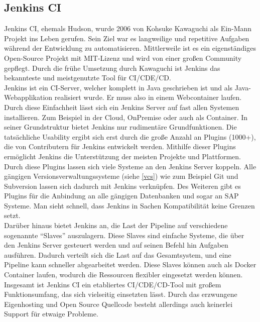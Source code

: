 \subsection{Jenkins CI} Jenkins CI, ehemals Hudson, wurde 2006 von Kohsuke Kawaguchi als Ein-Mann Projekt ins Leben gerufen.\autocite[Vgl.][S.56]{Wiest.2011} Sein Ziel war es langweilige und repetitive Aufgaben während der Entwicklung zu automatisieren. Mittlerweile ist es ein eigenständiges Open-Source Projekt mit MIT-Lizenz und wird von einer großen Community gepflegt. Durch die frühe Umsetzung durch Kawaguchi ist Jenkins das bekannteste und meistgenutzte Tool für \ac{CI}/\ac{CDE}/\ac{CD}.\autocite[Vgl.][]{Jenkins.2019}\\
Jenkins ist ein CI-Server, welcher komplett in Java geschrieben ist und als Java-Webapplikation realisiert wurde. Er muss also in einem Webcontainer laufen.\autocite[Vgl.][S.57]{Wiest.2011} Durch diese Einfachheit lässt sich ein Jenkins Server auf fast allen Systemen installieren. Zum Beispiel in der Cloud, OnPremise oder auch als Container. In seiner Grundstruktur bietet Jenkins nur rudimentäre Grundfunktionen. Die tatsächliche Usability ergibt sich erst durch die große Anzahl an Plugins (1000+),\autocite[Vgl.][]{Jenkins.2019} die von Contributern für Jenkins entwickelt werden. Mithilfe dieser Plugins ermöglicht Jenkins die Unterstützung der meisten Projekte und Plattformen.\\
Durch diese Plugins lassen sich viele Systeme an den Jenkins Server koppeln. Alle gängigen Versionsverwaltungssysteme (siehe \ref{vcs}) wie zum Beispiel Git und Subversion lassen sich dadurch mit Jenkins verknüpfen. Des Weiteren gibt es Plugins für die Anbindung an alle gängigen Datenbanken und sogar an SAP Systeme. Man sieht schnell, dass Jenkins in Sachen Kompatibilität keine Grenzen setzt.\autocite[Vgl.][]{Jenkins.2019}\\
Darüber hinaus bietet Jenkins an, die Last der Pipeline auf verschiedene sogenannte \enquote{Slaves} auszulagern. Diese Slaves sind einfache Systeme, die über den Jenkins Server gesteuert werden und auf seinen Befehl hin Aufgaben ausführen. Dadurch verteilt sich die Last auf das Gesamtsystem, und eine Pipeline kann schneller abgearbeitet werden. Diese Slaves können auch als Docker Container laufen, wodurch die Ressourcen flexibler eingesetzt werden können.\\
Insgesamt ist Jenkins CI ein etabliertes \ac{CI}/\ac{CDE}/\ac{CD}-Tool mit großem Funktionsumfang, das sich vielseitig einsetzten lässt. Durch das erzwungene Eigenhosting und Open Source Quellcode besteht allerdings auch keinerlei Support für etwaige Probleme.
